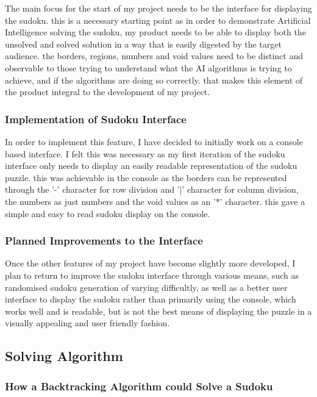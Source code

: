 \documentclass[]{final_report}
\begin{document}
The main focus for the start of my project needs to be the interface for displaying the sudoku. this is a necessary starting point as in order to demonstrate Artificial Intelligence solving the sudoku, my product needs to be able to display both the unsolved and solved solution in a way that is easily digested by the target audience. the borders, regions, numbers and void values need to be distinct and observable to those trying to understand what the AI algorithms is trying to achieve, and if the algorithms are doing so correctly. that makes this element of the product integral to the development of my project. 

\subsubsection{Implementation of Sudoku Interface}

In order to implement this feature, I have decided to initially work on a console based interface. I felt this was necessary as my first iteration of the sudoku interface only needs to display an easily readable representation of the sudoku puzzle. this was achievable in the console as the borders can be represented through the '-' character for row division and '|' character for column division, the numbers as just numbers and the void values as an '*' character. this gave a simple and easy to read sudoku display on the console. 

\subsubsection{Planned Improvements to the Interface} 

Once the other features of my project have become slightly more developed, I plan to return to improve the sudoku interface through various means, such as randomised sudoku generation of varying difficultly, as well as a better user interface to display the sudoku rather than primarily using the console, which works well and is readable, but is not the best means of displaying the puzzle in a visually appealing and user friendly fashion. 

\subsection*{Solving Algorithm} 

\subsubsection{How a Backtracking Algorithm could Solve a Sudoku} 
\end{document}
